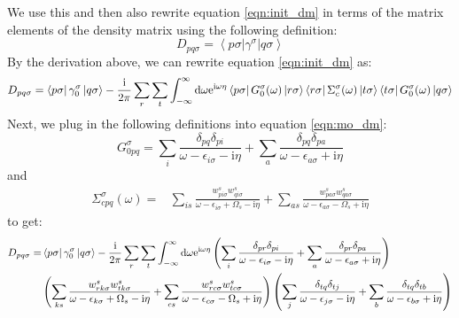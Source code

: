 \documentclass[12pt]{caltech_thesis}
\begin{document}
We use this and then also rewrite equation \ref{eqn:init_dm} in terms of the matrix elements of the density matrix using the following definition:
\begin{equation}
D_{p q \sigma}=\left\langle p \sigma\left|\gamma^\sigma\right| q \sigma\right\rangle
\end{equation}
By the derivation above, we can rewrite equation \ref{eqn:init_dm} as:
\begin{equation}
    D_{p q \sigma}=\bra{p\sigma } \gamma _0^\sigma \ket{q\sigma } -\frac{\mathrm{i }}{2 \pi} \sum_{r} \sum_{t} \int_{-\infty }^{\infty } \mathrm{d} \omega \mathrm{e}^{\mathrm{i \omega \eta}} \bra{p\sigma } G_0^\sigma (\omega) \ket{r\sigma } \bra{r\sigma } \Sigma_c^\sigma (\omega) \ket{t\sigma } \bra{t\sigma } G_0^\sigma (\omega) \ket{q\sigma }
\label{eqn:mo_dm}
\end{equation}
Next, we plug in the following definitions into equation \ref{eqn:mo_dm}:
\begin{equation}
G_{0 p q}^\sigma=\sum_i \frac{\delta_{p q} \delta_{p i}}{\omega-\epsilon_{i \sigma}-\mathrm{i} \eta}+\sum_a \frac{\delta_{p q} \delta_{p a}}{\omega-\epsilon_{a \sigma}+\mathrm{i} \eta}
\end{equation}
and
\begin{equation}
\begin{aligned}
\Sigma_{c p q}^\sigma(\omega)= & \sum_{i s} \frac{w_{p i \sigma}^s w_{q i \sigma}^s}{\omega-\epsilon_{i \sigma}+\Omega_s-\mathrm{i} \eta} +\sum_{a s} \frac{w_{p a \sigma}^s w_{q a \sigma}^s}{\omega-\epsilon_{a \sigma}-\Omega_s+\mathrm{i} \eta}
\end{aligned}
\end{equation}
to get:
\begin{equation}
\begin{aligned}
D_{p q \sigma}= & \bra{p\sigma } \gamma _0^\sigma \ket{q\sigma } -\frac{\mathrm{i }}{2 \pi} \sum_{r} \sum_{t} \int_{-\infty }^{\infty } \mathrm{d} \omega \mathrm{e}^{\mathrm{i \omega \eta}} \left( \sum_i \frac{\delta_{p r} \delta_{p i}}{\omega-\epsilon_{i \sigma}-\mathrm{i} \eta}+\sum_a \frac{\delta_{p r} \delta_{p a}}{\omega-\epsilon_{a \sigma}+\mathrm{i} \eta} \right)\\
& \left( \sum_{k s} \frac{w_{r k \sigma}^s w_{t k \sigma}^s}{\omega-\epsilon_{k \sigma}+\Omega_s-\mathrm{i} \eta} +\sum_{c s} \frac{w_{r c \sigma}^s w_{t c \sigma}^s}{\omega-\epsilon_{c \sigma}-\Omega_s+\mathrm{i} \eta} \right) \left( \sum_j \frac{\delta_{t q} \delta_{t j}}{\omega-\epsilon_{j \sigma}-\mathrm{i} \eta}+\sum_b \frac{\delta_{t q} \delta_{t b}}{\omega-\epsilon_{b \sigma}+\mathrm{i} \eta} \right)
\end{aligned}
\end{equation}
\end{document}
